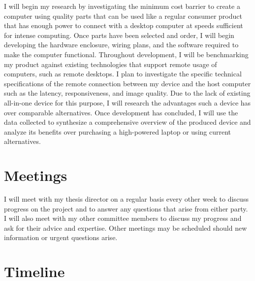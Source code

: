 \documentclass[11pt]{article}
\begin{document}
I will begin my research by investigating the minimum cost barrier to create a computer using quality parts that can be used like a regular consumer product that has enough power to connect with a desktop computer at speeds sufficient for intense computing.
Once parts have been selected and order, I will begin developing the hardware enclosure, wiring plans, and the software required to make the computer functional.
Throughout development, I will be benchmarking my product against existing technologies that support remote usage of computers, such as remote desktops.
I plan to investigate the specific technical specifications of the remote connection between my device and the host computer such as the latency, responsiveness, and image quality.
Due to the lack of existing all-in-one device for this purpose, I will research the advantages such a device has over comparable alternatives.
Once development has concluded, I will use the data collected to synthesize a comprehensive overview of the produced device and analyze its benefits over purchasing a high-powered laptop or using current alternatives.

\section*{Meetings}

I will meet with my thesis director on a regular basis every other week to discuss progress on the project and to answer any questions that arise from either party.
I will also meet with my other committee members to discuss my progress and ask for their advice and expertise.
Other meetings may be scheduled should new information or urgent questions arise.

\section*{Timeline}
\end{document}
